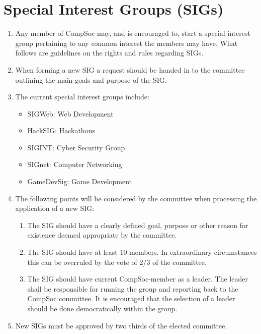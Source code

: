 \section{Special Interest Groups (SIGs)}

\begin{enumerate}

\item Any member of CompSoc may, and is encouraged to, start a special interest group pertaining to any common interest the members may have. What follows are guidelines on the rights and rules regarding SIGs.

\item When forming a new SIG a request should be handed in to the committee outlining the main goals and purpose of the SIG\@.

\item The current special interest groups include:
  \begin{itemize}
  \item SIGWeb: Web Development
  \item HackSIG\@: Hackathons
  \item SIGINT\@: Cyber Security Group
  \item SIGnet: Computer Networking
  \item GameDevSig: Game Development
  \end{itemize}

\item The following points will be considered by the committee when processing the application of a new SIG\@:
  \begin{enumerate}
  \item The SIG should have a clearly defined goal, purpose or other reason for existence deemed appropriate by the committee.
  \item The SIG should have at least 10 members. In extraordinary circumstances this can be overruled by the vote of 2/3 of the committee.
  \item The SIG should have current CompSoc-member as a leader. The leader shall be responsible for running the group and reporting back to the CompSoc committee. It is encouraged that the selection of a leader should be done democratically within the group.
  \end{enumerate}

\item New SIGs must be approved by two thirds of the elected committee.


\end{enumerate}
